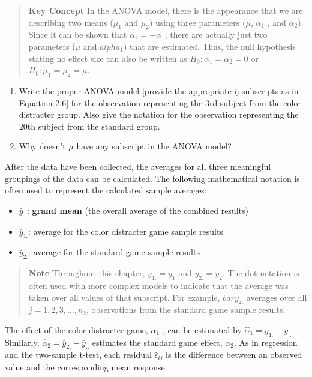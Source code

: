 \documentclass[
]{report}
\providecommand{\tightlist}{%
  \setlength{\itemsep}{0pt}\setlength{\parskip}{0pt}}
\begin{document}
\begin{quote}
\textbf{Key Concept}
In the ANOVA model, there is the appearance that we are describing two means (\(\mu_1\) and \(\mu_2\)) using three parameters (\(\mu\), \(\alpha_1\) , and \(\alpha_2\)). Since it can be shown that \(\alpha_2 = -\alpha_1\), there are actually just two parameters (\(\mu\) and \(alpha_1\)) that are estimated. Thus, the null hypothesis stating no effect size can also be written as \(H_0: \alpha_1 = \alpha_2 = 0\) or \(H_0: \mu_1 = \mu_2 = \mu\).
\end{quote}

\begin{enumerate}
\def\labelenumi{\arabic{enumi}.}
\setcounter{enumi}{16}
\item
  Write the proper ANOVA model {[}provide the appropriate ij subscripts as in Equation 2.6{]} for the observation representing the 3rd subject from the color distracter group. Also give the notation for the observation representing the 20th subject from the standard group.
\item
  Why doesn't \(\mu\) have any subscript in the ANOVA model?
\end{enumerate}

After the data have been collected, the averages for all three meaningful groupings of the data can be calculated. The following mathematical notation is often used to represent the calculated sample averages:

\begin{itemize}
\tightlist
\item
  \(\bar{y}_{..}\): \textbf{grand mean} (the overall average of the combined results)
\item
  \(\bar{y}_{1.}\): average for the color distracter game sample results
\item
  \(\bar{y}_{2.}\): average for the standard game sample results
\end{itemize}

\begin{quote}
\textbf{Note}
Throughout this chapter, \(\bar{y}_{1.} = \bar{y}_{1}\) and \(\bar{y}_{2.} = \bar{y}_{2}\). The dot notation is often used with more complex models
to indicate that the average was taken over all values of that subscript. For example, \(bar{y}_{2.}\) averages over all
\(j = 1, 2, 3, ... , n_2\), observations from the standard game sample results.
\end{quote}

The effect of the color distracter game, \(\alpha_1\) , can be estimated by \(\hat{\alpha}_1 = \bar{y}_{1.} - \bar{y}_{..}\). Similarly, \(\hat{\alpha}_2 = \bar{y}_{2.} - \bar{y}_{..}\)
estimates the standard game effect, \(\alpha_2\). As in regression and the two-sample t-test, each residual \(\hat{\epsilon}_{ij}\) is the
difference between an observed value and the corresponding mean response.
\end{document}
